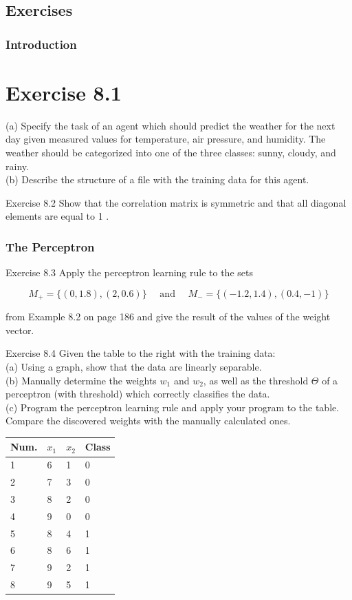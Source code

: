 \documentclass[10pt]{article}
\begin{document}
\subsection*{Exercises}
\subsubsection*{Introduction}
\section*{Exercise 8.1}
(a) Specify the task of an agent which should predict the weather for the next day given measured values for temperature, air pressure, and humidity. The weather should be categorized into one of the three classes: sunny, cloudy, and rainy.\\
(b) Describe the structure of a file with the training data for this agent.

Exercise 8.2 Show that the correlation matrix is symmetric and that all diagonal elements are equal to 1 .

\subsubsection*{The Perceptron}
Exercise 8.3 Apply the perceptron learning rule to the sets

$$
M_{+}=\{(0,1.8),(2,0.6)\} \quad \text { and } \quad M_{-}=\{(-1.2,1.4),(0.4,-1)\}
$$

from Example 8.2 on page 186 and give the result of the values of the weight vector.

Exercise 8.4 Given the table to the right with the training data:\\
(a) Using a graph, show that the data are linearly separable.\\
(b) Manually determine the weights $w_{1}$ and $w_{2}$, as well as the threshold $\Theta$ of a perceptron (with threshold) which correctly classifies the data.\\
(c) Program the perceptron learning rule and apply your program to the table. Compare the discovered weights with the manually calculated ones.

\begin{center}
\begin{tabular}{llll}
\hline
Num. & $x_{1}$ & $x_{2}$ & Class \\
\hline
1 & 6 & 1 & 0 \\
\hline
2 & 7 & 3 & 0 \\
\hline
3 & 8 & 2 & 0 \\
\hline
4 & 9 & 0 & 0 \\
\hline
5 & 8 & 4 & 1 \\
\hline
6 & 8 & 6 & 1 \\
\hline
7 & 9 & 2 & 1 \\
\hline
8 & 9 & 5 & 1 \\
\hline
\end{tabular}
\end{center}
\end{document}

